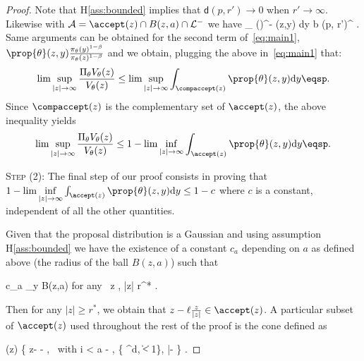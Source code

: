 \documentclass{article} %
\begin{document}
\begin{proof}
Note that H\ref{ass:bounded} implies that $\mathsf{d}(p, r') \to 0$ when $r' \to \infty$.
Likewise with  $\mathcal{A} = \accept(z) \cap B(z,a) \cap \mathcal{L}^-$ we have
\beq
\int_{} ()^{-\beta} \prop{\theta}(z,y) \textrm{d}y  \leq b (p, r')^{\beta} \eqsp.
\eeq
Same arguments can be obtained for the second term of~\eqref{eq:main1}, \ie\ $\prop{\theta}(z,y) \frac{\pi_\theta(y)^{1-\beta}}{\pi_\theta(z)^{1-\beta}}$ and we obtain, plugging the above in~\eqref{eq:main1} that:
\begin{align}
\lim \sup \limits_{|z| \to \infty}  \frac{\Pi_\theta V_\theta(z)}{V_\theta(z)} \leq \lim \sup \limits_{|z| \to \infty}  \int_{\compaccept(z)} \prop{\theta}(z,y)  \textrm{d}y \eqsp.
\end{align}
Since $\compaccept(z)$ is the complementary set of $\accept(z)$, the above inequality yields
\begin{align}
\lim \sup \limits_{|z| \to \infty}  \frac{\Pi_\theta V_\theta(z)}{V_\theta(z)} \leq 1 - \lim \inf \limits_{|z| \to \infty}  \int_{\accept(z)} \prop{\theta}(z,y)  \textrm{d}y \eqsp.
\end{align}



\medskip
\noindent \textsc{Step (2): } The final step of our proof consists in proving that $1 - \lim \inf \limits_{|z| \to \infty}  \int_{\accept(z)} \prop{\theta}(z,y)  \textrm{d}y \leq 1 - c$ where $c$ is a constant, independent of all the other quantities.


Given that the proposal distribution is a Gaussian and using assumption H\ref{ass:bounded} we have the existence of a constant $c_a$ depending on $a$ as defined above (the radius of the ball $B(z,a)$) such that

\beq\label{eq:gauss}
 \leq  c_a \leq \inf \limits_{y \in B(z,a)}  \quad \textrm{for any} \, z \in \zset, |z| \geq r^* \eqsp.
\eeq

Then for any $|z| \geq r^*$, we obtain that $z- \ell \frac{z}{|z|} \in \accept(z)$.
A particular subset of $\accept(z)$ used throughout the rest of the proof is the cone defined as 

\beq\label{eq:defcone}
(z) \eqdef \{ z- \ell {} - \kappa \nu , \, \textrm{with} \quad i < a - \ell  , \nu \in \{ \nu \in \rset^d, \| \nu \| < 1\}, |\nu -  \leq {}   \} \eqsp.
\eeq


\end{proof}
\end{document}
